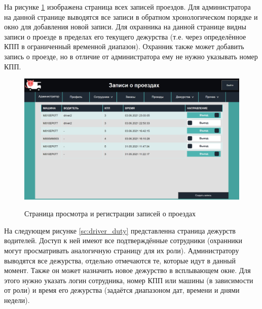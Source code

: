 На рисунке \ref{sc:all_pass} изображена страница всех записей проездов. Для администратора на данной странице выводятся все записи в обратном хронологическом порядке и окно для добавления новой записи. Для охранника на данной странице видны записи о проезде в пределах его текущего дежурства (т.е. через определённое КПП в ограниченный временной диапазон). Охранник также может добавить запись о проезде, но в отличие от администратора ему не нужно указывать номер КПП.

\begin{figure}[h!] 
	\begin{center}
		{\includegraphics[scale=0.45, angle=0]{sc/all_pass}}
		\caption{Страница просмотра и регистрации записей о проездах}
		\label{sc:all_pass}
	\end{center}
\end{figure}

На следующем рисунке \ref{sc:driver_duty} представленна страница дежурств водителей. Доступ к ней имеют все подтверждённые сотрудники (охранники могут просматривать аналогичную страницу для их роли). Администратору выводятся все дежурства, отдельно отмечаются те, которые идут в данный момент. Также он может назначить новое дежурство в всплывающем окне. Для этого нужно указать логин сотрудника, номер КПП или машины (в зависимости от роли) и время его дежурства (задаётся диапазоном дат, времени и днями недели).  

